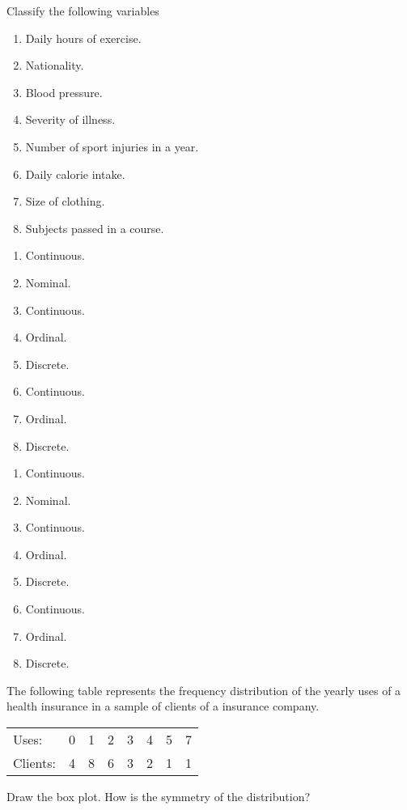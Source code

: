 {Classify the following variables
\begin{enumerate}
\item Daily hours of exercise.
\item Nationality.
\item Blood pressure.
\item Severity of illness.
\item Number of sport injuries in a year.
\item Daily calorie intake.
\item Size of clothing.
\item Subjects passed in a course.
\end{enumerate}
}
{\begin{enumerate}
\item Continuous.
\item Nominal.
\item Continuous.
\item Ordinal.
\item Discrete.
\item Continuous.
\item Ordinal.
\item Discrete.
\end{enumerate}
}
{\begin{enumerate}
\item Continuous.
\item Nominal.
\item Continuous.
\item Ordinal.
\item Discrete.
\item Continuous.
\item Ordinal.
\item Discrete.
\end{enumerate}
}


{The following table represents the frequency distribution of the yearly uses of a health insurance in a sample of
clients of a insurance company.

\begin{center}
\begin{tabular}{lrrrrrrr}
\toprule
Uses: & 0 & 1 & 2 & 3 & 4 & 5 & 7 \\
Clients: & 4 & 8 & 6 & 3 & 2 & 1 & 1\\
\bottomrule
\end{tabular}
\end{center}

Draw the box plot. How is the symmetry of the distribution?
}
{
}
{
}


